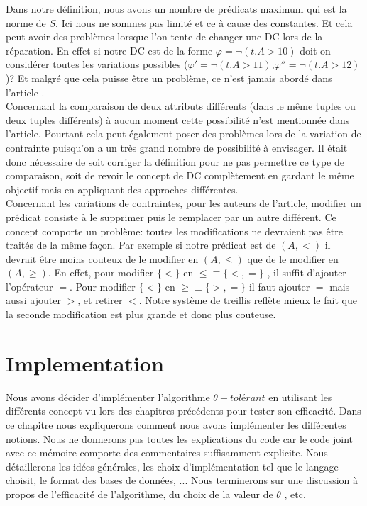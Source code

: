 \documentclass[letterpaper, 12pt]{report}
\theoremstyle{definition}
\begin{document}
Dans notre définition, nous avons un nombre de prédicats maximum qui est la norme de $S$. Ici nous ne sommes pas limité et ce à cause des constantes. Et cela peut avoir des problèmes lorsque l'on tente de changer une DC lors de la réparation. En effet si notre DC est de la forme $\varphi = \neg(t.A >10)$ doit-on considérer toutes les variations possibles ($\varphi' = \neg(t.A >11)$,$\varphi'' = \neg(t.A >12)$)? Et malgré que cela puisse être un problème, ce n'est jamais abordé dans l'article \cite{main}.\\

Concernant la comparaison de deux attributs différents (dans le même tuples ou deux tuples différents) à aucun moment cette possibilité n'est mentionnée dans l'article. Pourtant cela peut également poser des problèmes lors de la variation de contrainte puisqu'on a un très grand nombre de possibilité à envisager. Il était donc nécessaire de soit corriger la définition pour ne pas permettre ce type de comparaison, soit de revoir le concept de DC complètement en gardant le même objectif mais en appliquant des approches différentes.\\

Concernant les variations de contraintes, pour les auteurs de l'article, modifier un prédicat consiste à le supprimer puis le remplacer par un autre différent. Ce concept comporte un problème: toutes les modifications ne devraient pas être traités de la même façon. Par exemple si notre prédicat est de $(A,<)$ il devrait être moins couteux de le modifier en $(A,\leq)$ que de le modifier en $(A, \geq)$. En effet, pour modifier $\{ < \}$ en $ \leq \equiv \{<,= \}$ , il suffit d'ajouter l'opérateur $=$. Pour modifier $\{ <\}$ en $\geq \equiv \{ >,=\}$ il faut ajouter $=$ mais aussi ajouter $>$, et retirer $<$. Notre système de treillis reflète mieux le fait que la seconde modification est plus grande et donc plus couteuse.

\chapter{Implementation}

Nous avons décider d'implémenter l'algorithme $\theta-tolérant$ en utilisant les différents concept vu lors des chapitres précédents pour tester son efficacité. Dans ce chapitre nous expliquerons comment nous avons implémenter les différentes notions. Nous ne donnerons pas toutes les explications du code car le code joint avec ce mémoire comporte des commentaires suffisamment explicite. Nous détaillerons les idées générales, les choix d'implémentation tel que le langage choisit, le format des bases de données, ... Nous terminerons sur une discussion à propos de l'efficacité de l'algorithme, du choix de la valeur de $\theta$ , etc.
\end{document}
